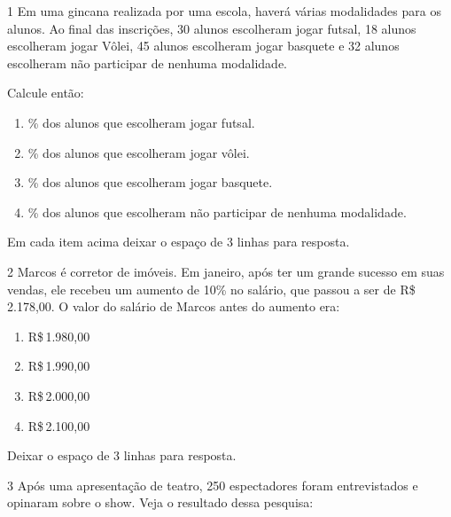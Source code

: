 \num{1} Em uma gincana realizada por uma escola, haverá várias modalidades
para os alunos. Ao final das inscrições, 30 alunos escolheram jogar
futsal, 18 alunos escolheram jogar Vôlei, 45 alunos escolheram jogar
basquete e 32 alunos escolheram não participar de nenhuma modalidade.

Calcule então:

\begin{enumerate}[itemsep=-5pt]
\item \% dos alunos que escolheram jogar futsal.\\
\item \% dos alunos que escolheram jogar vôlei.\\
\item \% dos alunos que escolheram jogar basquete.\\
\item \% dos alunos que escolheram não participar de nenhuma modalidade.\\
\end{enumerate}

Em cada item acima deixar o espaço de 3 linhas para resposta.






\num{2} Marcos é corretor de imóveis. Em janeiro, após ter um grande sucesso
em suas vendas, ele recebeu um aumento de 10\% no salário, que passou a
ser de R\$\,2.178,00. O valor do salário de Marcos antes do aumento era:

\begin{enumerate}
\item R\$\,1.980,00
\item R\$\,1.990,00
\item R\$\,2.000,00
\item R\$\,2.100,00
\end{enumerate}


Deixar o espaço de 3 linhas para resposta.


\num{3} Após uma apresentação de teatro, 250 espectadores foram entrevistados
e opinaram sobre o show. Veja o resultado dessa pesquisa:

